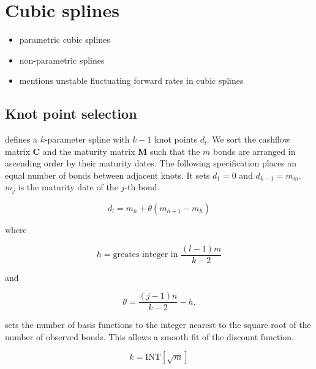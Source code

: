 \section{Cubic splines}
\label{sec:cubic-splines}

\begin{itemize}
\item parametric cubic splines \cite{McCulloch1971, McCulloch1975}
\item non-parametric splines \cite{Adams1994,Fisher1995, Waggoner1997, Tanggaard1997, Shea1985}
\item \cite{Shea1985} mentions unstable fluctuating forward rates in \cite{McCulloch1975} cubic splines

\end{itemize}

\subsection{Knot point selection}

\cite{McCulloch1975} defines a $k$-parameter spline with $k-1$ knot points $d_l$. We sort the cashflow matrix $\bm{C}$ and the maturity matrix $\bm{M}$ such that the $m$ bonds are arranged in ascending order by their maturity dates. The following specification places an equal number of bonds between adjacent knots. It sets $d_1=0$ and $d_{k-1}=m_m$. $m_j$ is the maturity date of the $j$-th bond.


\begin{equation}
  \label{eq:A.1a}
  d_l = m_h+\theta(m_{h+1}-m_h)
\end{equation}

where

\begin{equation}
 \label{eq:A.1b}
  h = \mbox{greates integer in }\frac{(l-1)m}{k-2}
\end{equation}

and

\begin{equation}
  \label{eq:A.1c}
  \theta = \frac{(j-1)n}{k-2}-h.
\end{equation}

\cite{McCulloch1971} sets the  number of basis functions to the integer nearest to the square root of the number of observed bonds. This allows a smooth fit of the discount function.

\begin{equation}
  \label{eq:nofknots}
  k = \mbox{INT}\left[\sqrt{m}\right]
\end{equation}


